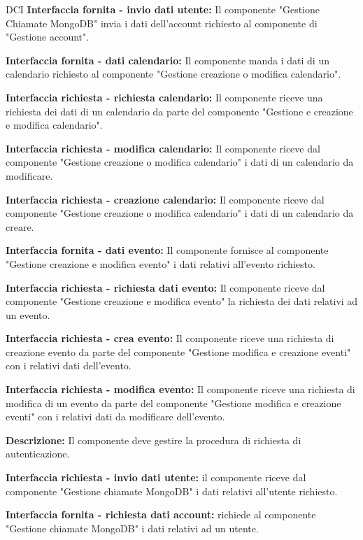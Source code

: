 \begin{listaPersonale}{DCI}
    \textbf{Interfaccia fornita - invio dati utente:} Il componente "Gestione Chiamate MongoDB" invia i dati dell'account richiesto al componente di "Gestione account".

    \textbf{Interfaccia fornita - dati calendario:} Il componente manda i dati di un calendario richiesto al componente "Gestione creazione o modifica calendario".

    \textbf{Interfaccia richiesta - richiesta calendario:} Il componente riceve una richiesta dei dati di un calendario da parte del componente "Gestione e creazione e modifica calendario".

    \textbf{Interfaccia richiesta - modifica calendario:} Il componente riceve dal componente "Gestione creazione o modifica calendario" i dati di un calendario da modificare.

    \textbf{Interfaccia richiesta  - creazione calendario:} Il componente riceve dal componente "Gestione creazione o modifica calendario" i dati di un calendario da creare.

    \textbf{Interfaccia fornita - dati evento:} Il componente fornisce al componente "Gestione creazione e modifica evento" i dati relativi all'evento richiesto.

    \textbf{Interfaccia richiesta - richiesta dati evento:} Il componente riceve dal componente "Gestione creazione e modifica evento" la richiesta dei dati relativi ad un evento.

    \textbf{Interfaccia richiesta - crea evento:} Il componente riceve una richiesta di creazione evento da parte del componente "Gestione modifica e creazione eventi" con i relativi dati dell'evento.

    \textbf{Interfaccia richiesta - modifica evento:} Il componente riceve una richiesta di modifica di un evento da parte del componente "Gestione modifica e creazione eventi" con i relativi dati da modificare dell'evento.





    \textbf{Descrizione:}  Il componente deve gestire la procedura di richiesta di autenticazione.

    \textbf{Interfaccia richiesta - invio dati utente:} il componente riceve dal componente "Gestione chiamate MongoDB" i dati relativi all'utente richiesto.

    \textbf{Interfaccia fornita - richiesta dati account:} richiede al componente "Gestione chiamate MongoDB" i dati relativi ad un utente.


\end{listaPersonale}
